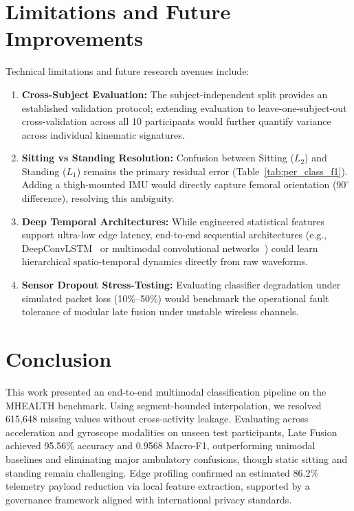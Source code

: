 \documentclass[10pt,twocolumn]{article}
\begin{document}
\section{Limitations and Future Improvements}
\label{sec:limitations}
Technical limitations and future research avenues include:
\begin{enumerate}[leftmargin=*,nosep]
    \item \textbf{Cross-Subject Evaluation:} The subject-independent split provides an established validation protocol; extending evaluation to leave-one-subject-out cross-validation across all 10 participants would further quantify variance across individual kinematic signatures.
    \item \textbf{Sitting vs Standing Resolution:} Confusion between Sitting ($L_2$) and Standing ($L_1$) remains the primary residual error (Table~\ref{tab:per_class_f1}). Adding a thigh-mounted IMU would directly capture femoral orientation ($90^\circ$ difference), resolving this ambiguity.
    \item \textbf{Deep Temporal Architectures:} While engineered statistical features support ultra-low edge latency, end-to-end sequential architectures (e.g., DeepConvLSTM~\cite{ordonez2016deep} or multimodal convolutional networks~\cite{radu2018multimodal}) could learn hierarchical spatio-temporal dynamics directly from raw waveforms.
    \item \textbf{Sensor Dropout Stress-Testing:} Evaluating classifier degradation under simulated packet loss (10\%--50\%) would benchmark the operational fault tolerance of modular late fusion under unstable wireless channels.
\end{enumerate}

\section{Conclusion}
\label{sec:conclusion}
This work presented an end-to-end multimodal classification pipeline on the MHEALTH benchmark. Using segment-bounded interpolation, we resolved 615,648 missing values without cross-activity leakage. Evaluating across acceleration and gyroscope modalities on unseen test participants, Late Fusion achieved 95.56\% accuracy and 0.9568 Macro-F1, outperforming unimodal baselines and eliminating major ambulatory confusions, though static sitting and standing remain challenging. Edge profiling confirmed an estimated 86.2\% telemetry payload reduction via local feature extraction, supported by a governance framework aligned with international privacy standards.





\end{document}
